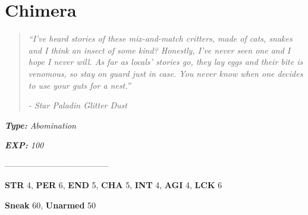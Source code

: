 \documentclass[11pt,a4paper,twocolumn]{book}
\begin{document}
	\clearpage
	
	\section*{Chimera}
	\begin{verse}
		\emph{``I've heard stories of these mix-and-match critters, made of cats, snakes and I think an insect of some kind? Honestly, I've never seen one and I hope I never will. As far as locals' stories go, they lay eggs and their bite is venomous, so stay on guard just in case. You never know when one decides to use your guts for a nest.''}
		
		\emph{-	Star Paladin Glitter Dust}
	\end{verse}
	
	\noindent
	\emph{\textbf{Type:} Abomination}
	
	\noindent
	\emph{\textbf{EXP:} 100}
	
%		
%	
%		

		--------------------------------------

\noindent
\textbf{STR} 4, \textbf{PER} 6, \textbf{END} 5, \textbf{CHA} 5, \textbf{INT} 4, \textbf{AGI} 4, \textbf{LCK} 6

\noindent
\textbf{Sneak} 60, \textbf{Unarmed} 50
\end{document}
